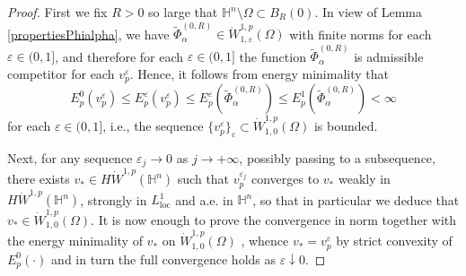 \documentclass[10pt]{amsart}
\numberwithin{equation}{section}
\theoremstyle{definition}
\newcommand{\He}{\mathbb{H}}
\begin{document}
\begin{proof}
First we fix $R>0$ so large that $\He^n \setminus \Omega \subset B_R(0)$. 
In view of Lemma \ref{propertiesPhialpha}, we have $\tilde{\Phi}^{(0,R)}_{\alpha}\in \dot{W}^{1,p}_{1,\varepsilon}(\Omega)$ with finite norms for each $\varepsilon\in (0,1]$, and therefore for each $\varepsilon \in (0,1]$ the function $\tilde{\Phi}^{(0,R)}_{\alpha}$ is admissible competitor for each $v^\varepsilon_p$. Hence, it follows from energy minimality that
$$E^{0}_{p}\left(v^{\varepsilon}_{p}\right)\leq E^{\varepsilon}_{p}\left(v^{\varepsilon}_{p}\right)\leq E^{\varepsilon}_{p}\left(\tilde{\Phi}^{(0,R)}_{\alpha}\right)\leq E^{1}_{p}\left(\tilde{\Phi}^{(0,R)}_{\alpha}\right)<\infty$$
 for each $\varepsilon \in (0,1]$, i.e., the sequence $\{v^\varepsilon_p\}_{\varepsilon} \subset \dot{W}^{1,p}_{1,0}(\Omega)$ is bounded. 
 
 Next, for any sequence $\varepsilon_{j}\to 0$ as $j\to+\infty$, possibly passing to a subsequence, there exists $v_*\in H\dot{W}^{1,p}(\mathbb{H}^{n})$ such that $v^{\varepsilon_{j}}_{p}$ converges to $v_*$ weakly in $H\dot{W}^{1,p}(\mathbb{H}^{n})$, strongly in $L^{1}_{\mathrm{loc}}$ and a.e. in $\mathbb{H}^{n}$, so that in particular we deduce that $v_* \in \dot{W}^{1,p}_{1,0}(\Omega)$.
It is now enough to prove the convergence in norm together with the energy minimality of $v_*$ on $\dot{W}^{1,p}_{1,0}(\Omega)$ , whence $v_*=v_p^\varepsilon$ by strict convexity of $E^0_p(\cdot)$ and in turn the full convergence holds as $\varepsilon \downarrow 0$. 


\end{proof}
\end{document}
